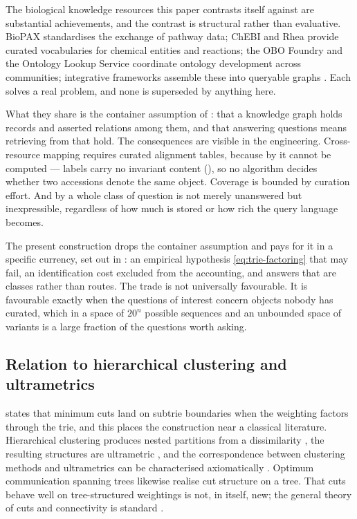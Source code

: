 \documentclass[11pt,twocolumn,a4paper]{article}
\theoremstyle{thmstyle}
\theoremstyle{definition}
\theoremstyle{remark}
\begin{document}
The biological knowledge resources this paper contrasts itself against
are substantial achievements, and the contrast is structural rather
than evaluative. BioPAX \citep{demir2010} standardises the exchange of
pathway data; ChEBI \citep{hastings2016} and Rhea \citep{bansal2022}
provide curated vocabularies for chemical entities and reactions; the
OBO Foundry \citep{smith2007} and the Ontology Lookup Service
\citep{jupp2015} coordinate ontology development across communities;
integrative frameworks assemble these into queryable graphs
\citep{callahan2020}. Each solves a real problem, and none is
superseded by anything here.

What they share is the container assumption of :
that a knowledge graph holds records and asserted relations among them,
and that answering questions means retrieving from that hold. The
consequences are visible in the engineering. Cross-resource mapping
requires curated alignment tables, because by  it
cannot be computed --- labels carry no invariant content
(), so no algorithm decides whether two accessions
denote the same object. Coverage is bounded by curation effort. And by
 a whole class of question is not merely
unanswered but inexpressible, regardless of how much is stored or how
rich the query language becomes.

The present construction drops the container assumption and pays for it
in a specific currency, set out in : an empirical
hypothesis \eqref{eq:trie-factoring} that may fail, an identification
cost excluded from the accounting, and answers that are classes rather
than routes. The trade is not universally favourable. It is favourable
exactly when the questions of interest concern objects nobody has
curated, which in a space of $20^{n}$ possible sequences and an
unbounded space of variants is a large fraction of the questions worth
asking.

\subsection{Relation to hierarchical clustering and ultrametrics}

 states that minimum cuts land on subtrie
boundaries when the weighting factors through the trie, and this places
the construction near a classical literature. Hierarchical clustering
produces nested partitions from a dissimilarity
\citep{johnson1967,hartigan1967}, the resulting structures are
ultrametric \citep{jardine1971}, and the correspondence between
clustering methods and ultrametrics can be characterised axiomatically
\citep{carlsson2010}. Optimum communication spanning trees
\citep{hu1974} likewise realise cut structure on a tree. That cuts
behave well on tree-structured weightings is not, in itself, new; the
general theory of cuts and connectivity is standard
\citep{diestel2017}.
\end{document}
